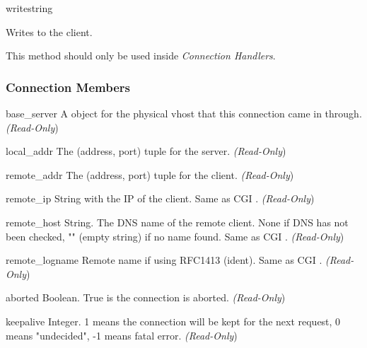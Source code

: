 \begin{methoddesc}[connection]{write}{string}

Writes  to the client.

This method should only be used inside \emph{Connection Handlers}.

\end{methoddesc}

\subsubsection{Connection Members\label{pyapi-mpconn-mem}}

\begin{memberdesc}[connection]{base_server}
A  object for the physical vhost that this connection came in
through.
\emph{(Read-Only})
\end{memberdesc}

\begin{memberdesc}[connection]{local_addr}
The (address, port) tuple for the server.
\emph{(Read-Only})
\end{memberdesc}

\begin{memberdesc}[connection]{remote_addr}
The (address, port) tuple for the client.
\emph{(Read-Only})
\end{memberdesc}

\begin{memberdesc}[connection]{remote_ip}
String with the IP of the client. Same as CGI .
\emph{(Read-Only})
\end{memberdesc}

\begin{memberdesc}[connection]{remote_host}
String. The DNS name of the remote client. None if DNS has not been
checked, "" (empty string) if no name found. Same as CGI .
\emph{(Read-Only})
\end{memberdesc}

\begin{memberdesc}[connection]{remote_logname}
Remote name if using RFC1413 (ident). Same as CGI .
\emph{(Read-Only})
\end{memberdesc}

\begin{memberdesc}[connection]{aborted}
Boolean. True is the connection is aborted.
\emph{(Read-Only})
\end{memberdesc}

\begin{memberdesc}[connection]{keepalive}
Integer. 1 means the connection will be kept for the next request, 0 means
"undecided", -1 means fatal error.
\emph{(Read-Only})
\end{memberdesc}

